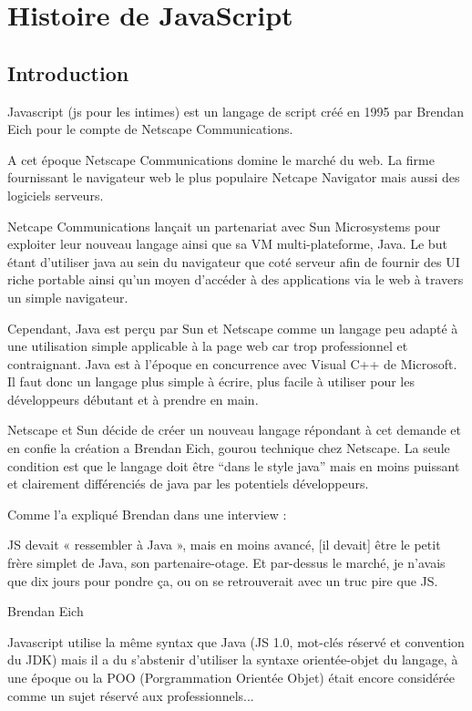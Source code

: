 \chapter{Histoire de JavaScript}
\label{ch:histoire}

\section*{Introduction}


Javascript (js pour les intimes) est un langage de script créé en 1995 par Brendan Eich pour le compte de Netscape Communications.

A cet époque Netscape Communications domine le marché du web. La firme fournissant le navigateur web le plus populaire Netcape Navigator mais aussi des logiciels serveurs.

Netcape Communications lançait un partenariat avec Sun Microsystems pour exploiter leur nouveau langage ainsi que sa VM multi-plateforme, Java. Le but étant d’utiliser java au sein du navigateur que coté serveur afin de fournir des UI riche portable ainsi qu’un moyen d’accéder à des applications via le web à travers un simple navigateur.

Cependant, Java est perçu par Sun et Netscape comme un langage peu adapté à une utilisation simple applicable à la page web car trop professionnel et contraignant. Java est à l’époque en concurrence avec Visual C++ de Microsoft. Il faut donc un langage plus simple à écrire, plus facile à utiliser pour les développeurs débutant et à prendre en main.

Netscape et Sun décide de créer un nouveau langage répondant à cet demande et en confie la création a Brendan Eich, gourou technique chez Netscape. La seule condition est que le langage doit être “dans le style java”  mais en moins puissant et clairement différenciés de java par les potentiels développeurs.

Comme l’a expliqué Brendan dans une interview :

JS devait « ressembler à Java », mais en moins avancé, [il devait] être le petit frère simplet de Java, son partenaire-otage. Et par-dessus le marché, je n’avais que dix jours pour pondre ça, ou on se retrouverait avec un truc pire que JS.

Brendan Eich

Javascript utilise la même syntax que Java (JS 1.0, mot-clés réservé et convention du JDK) mais il a du s’abstenir d’utiliser la syntaxe orientée-objet du langage, à une époque ou la POO (Porgrammation Orientée Objet) était encore considérée comme un sujet réservé aux professionnels...

